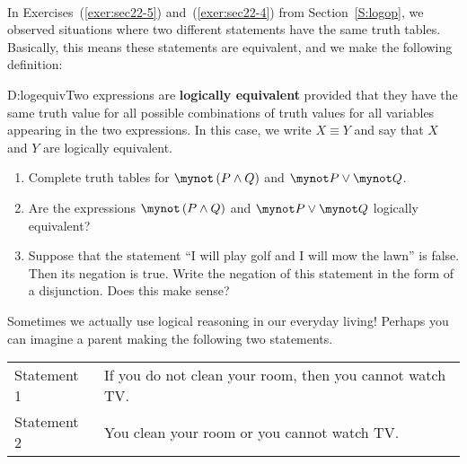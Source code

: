 \begin{previewactivity}\label{PA:logequiv} \hfill \\
In Exercises~(\ref{exer:sec22-5}) and~(\ref{exer:sec22-4}) from Section~\ref{S:logop}, we observed situations where two different statements have the same truth tables.  Basically, this means these statements are equivalent, and we make the following definition:
\begin{defbox}{D:logequiv}{Two expressions are \textbf{logically equivalent}
%
 provided that they have the same truth value for all possible combinations of truth values for all variables appearing in the two expressions.  In this case, we write  $X \equiv Y$  
\label{sym:logequiv}%
and say that  $X$  and  $Y$  are logically equivalent.} 
\end{defbox}

\begin{enumerate}
\item Complete truth tables for  $\mynot  \left( {P \wedge Q} \right)$  and  $\mynot  P \vee \mynot  Q$.


\item Are the expressions  $\mynot  \left( {P \wedge Q} \right)$  and   $\mynot  P \vee \mynot  Q$  logically equivalent?

\item Suppose that the statement ``I will play golf and I will mow the lawn'' is false.  Then its negation is true.  Write the negation of this statement in the form of a disjunction.  Does this make sense?
\end{enumerate}
\end{previewactivity}


%
Sometimes we actually use logical reasoning in our everyday living!  Perhaps you can imagine a parent making the following two statements.
\begin{center}
\begin{tabular}{l p{3in}}
Statement 1  &  If you do not clean your room, then you cannot watch TV. \\
Statement 2  &  You clean your room or you cannot watch TV. \\
\end{tabular}
\end{center}

